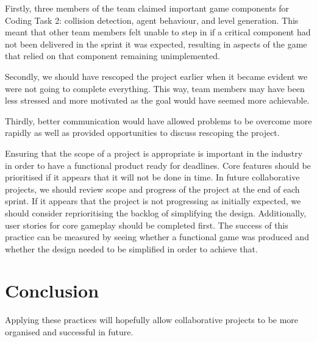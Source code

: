 \documentclass{scrartcl}
\begin{document}
Firstly, three members of the team claimed important game components for Coding Task 2: collision detection, agent behaviour, and level generation. This meant that other team members felt unable to step in if a critical component had not been delivered in the sprint it was expected, resulting in aspects of the game that relied on that component remaining unimplemented. 

Secondly, we should have rescoped the project earlier when it became evident we were not going to complete everything. This way, team members may have been less stressed and more motivated as the goal would have seemed more achievable. 

Thirdly, better communication would have allowed problems to be overcome more rapidly as well as provided opportunities to discuss rescoping the project.

Ensuring that the scope of a project is appropriate is important in the industry in order to have a functional product ready for deadlines. Core features should be prioritised if it appears that it will not be done in time.
In future collaborative projects, we should review scope and progress of the project at the end of each sprint. If it appears that the project is not progressing as initially expected, we should consider reprioritising the backlog of simplifying the design. Additionally, user stories for core gameplay should be completed first. The success of this practice can be measured by seeing whether a functional game was produced and whether the design needed to be simplified in order to achieve that.


\section{Conclusion}
Applying these practices will hopefully allow collaborative projects to be more organised and successful in future. 


\end{document}
